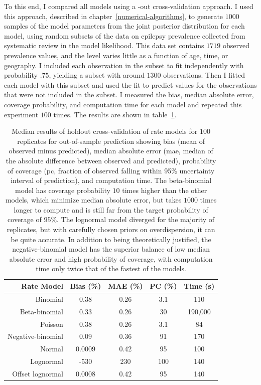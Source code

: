 To this end, I compared all models using a -out cross-validation
approach.  I used this approach, described in
chapter~\ref{numerical-algorithms}, to generate $1000$ samples of the
model parameters from the joint posterior distribution for each model,
using random subsets of the data on epilepsy prevalence collected from
systematic review\cite{TK_Epilepsy_EG_report} in the model likelihood.  This data set
contains $1719$ observed prevalence values, and the level varies
little as a function of age, time, or geography.  I included each
observation in the subset to fit independently with probability $.75$,
yielding a subset with around $1300$ observations. Then I fitted each
model with this subset and used the fit to predict values for the
observations that were not included in the subset.  I measured the
bias, median absolute error, coverage probability, and computation
time for each model and repeated this experiment $100$ times.  The
results are shown in table~\ref{rate-comparison}.

\begin{table}
\begin{center}
\begin{tabular}{|r|c|c|c|c|}
\hline
Rate Model       &Bias (\%)&MAE (\%)&PC (\%)&Time (s)\\
\hline
Binomial         &0.38     &0.26    &3.1    &110\\
Beta-binomial    &0.33     &0.26    &30     &190,000\\
Poisson          &0.38     &0.26    &3.1    &84\\
Negative-binomial&0.09     &0.36    &91     &170\\
Normal           &0.0009   &0.42    &95     &100\\
Lognormal       &-530     &230     &100    &140\\
Offset lognormal&0.0008   &0.42    &95     &140\\
\hline
\end{tabular}
\end{center}
\caption{Median results of holdout cross-validation of rate models
  for $100$ replicates for out-of-sample prediction showing bias (mean
  of observed minus predicted), median absolute error (mae, median of
  the absolute difference between observed and predicted), probability
  of coverage (pc, fraction of observed falling within 95\% uncertainty
  interval of prediction), and computation time.  The beta-binomial
  model has coverage probability $10$ times higher than the other
  models, which minimize median absolute error, but takes $1000$ times
  longer to compute and is still far from the target probability of coverage of $95\%$.
  The lognormal model diverged for the majority of replicates, but
  with carefully chosen priors on overdispersion, it can be quite
  accurate.  In addition to being theoretically justified, the
  negative-binomial model has the superior balance of low median absolute error and high
  probability of coverage, with computation time only twice that of the fastest of the
  models.}
\label{rate-comparison}
\end{table}

